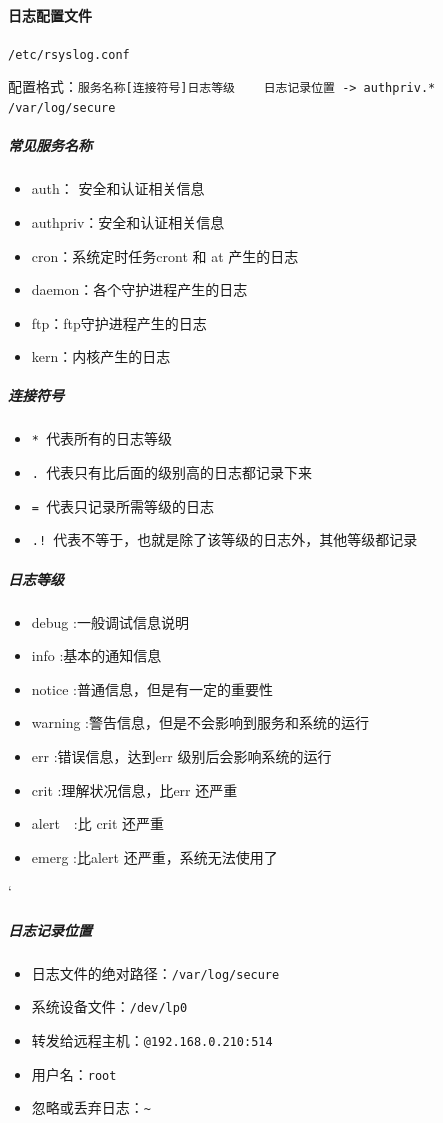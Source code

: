\documentclass[UTF8,a4paper,12pt]{ctexbook}
\begin{document}
			\paragraph{日志配置文件}\verb|/etc/rsyslog.conf|
			
				配置格式：\verb|服务名称[连接符号]日志等级    日志记录位置 -> authpriv.*   /var/log/secure|
			
				\subparagraph{常见服务名称}
					\begin{itemize}[itemindent = 1em]
						\item auth： 安全和认证相关信息
						\item authpriv：安全和认证相关信息
						\item cron：系统定时任务cront 和 at 产生的日志
						\item daemon：各个守护进程产生的日志
						\item ftp：ftp守护进程产生的日志
						\item kern：内核产生的日志
					\end{itemize}
					
				\subparagraph{连接符号}
					\begin{itemize}[itemindent = 1em]
						\item \verb|* |代表所有的日志等级
						\item \verb|. |代表只有比后面的级别高的日志都记录下来
						\item \verb|= |代表只记录所需等级的日志
						\item \verb|.! |代表不等于，也就是除了该等级的日志外，其他等级都记录
					\end{itemize}
					
				\subparagraph{日志等级}
					\begin{itemize}[itemindent = 1em]
						\item debug :一般调试信息说明
						\item info :基本的通知信息
						\item notice :普通信息，但是有一定的重要性
						\item warning :警告信息，但是不会影响到服务和系统的运行
						\item err :错误信息，达到err 级别后会影响系统的运行
						\item crit :理解状况信息，比err  还严重
						\item alert　:比 crit 还严重
						\item emerg :比alert 还严重，系统无法使用了
					\end{itemize}‘
				
				\subparagraph{日志记录位置}
					\begin{itemize}[itemindent = 1em]
						\item 日志文件的绝对路径：\verb|/var/log/secure|
						\item 系统设备文件：\verb|/dev/lp0|
						\item 转发给远程主机：\verb|@192.168.0.210:514|
						\item 用户名：\verb|root|
						\item 忽略或丢弃日志：\verb|~|
					\end{itemize}
					
\end{document}
